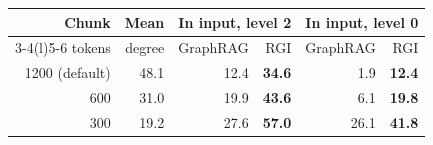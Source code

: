 \begin{tabular}{@{}rrrrrr@{}}
\toprule
Chunk & Mean & \multicolumn{2}{c}{In input, level 2} & \multicolumn{2}{c}{In input, level 0} \\
\cmidrule(lr){3-4}\cmidrule(l){5-6}
tokens & degree & GraphRAG & RGI & GraphRAG & RGI \\
\midrule
1200 (default) & 48.1 & 12.4 & \textbf{34.6} & 1.9 & \textbf{12.4} \\
600 & 31.0 & 19.9 & \textbf{43.6} & 6.1 & \textbf{19.8} \\
300 & 19.2 & 27.6 & \textbf{57.0} & 26.1 & \textbf{41.8} \\
\bottomrule
\end{tabular}
